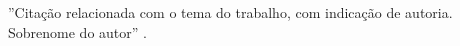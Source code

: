 


\vspace*{10cm}

    \vspace*{5cm}
	
		''Citação relacionada com o tema do trabalho, com indicação de autoria. Sobrenome do autor'' \cite[p. 4]{manualufpe2020}.
	
\newpage
